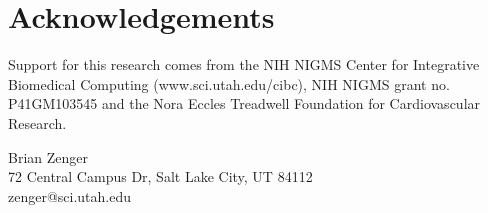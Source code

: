 \documentclass[twocolumn]{cinc}
\begin{document}
\balance


\section*{Acknowledgements}  
% 
Support for this research comes from the NIH NIGMS Center for Integrative
Biomedical Computing (www.sci.utah.edu/cibc), NIH NIGMS grant
no. P41GM103545 and the Nora Eccles Treadwell Foundation for Cardiovascular
Research.






\begin{correspondence}
Brian Zenger\\
72 Central Campus Dr, Salt Lake City, UT 84112\\
zenger@sci.utah.edu
\end{correspondence}

\end{document}

